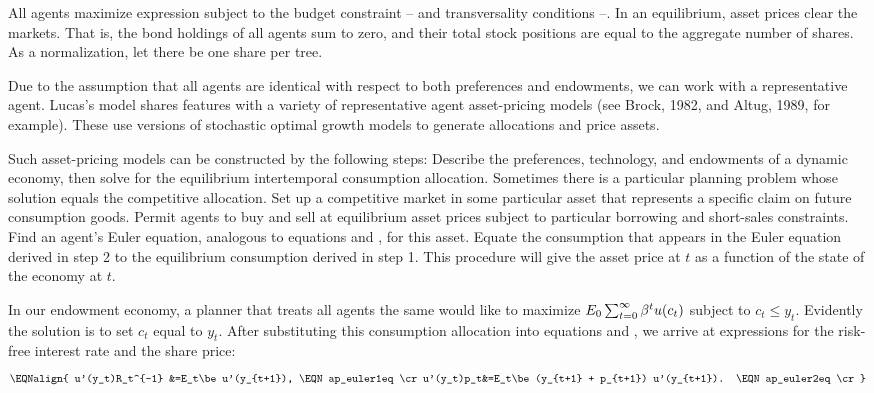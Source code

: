 All agents maximize expression  subject to the
budget constraint -- and transversality
conditions --. In an equilibrium, asset prices
clear the markets. That is, the bond holdings of all
agents sum to zero, and their total stock positions are equal to
the aggregate number of shares. As a normalization, let there be
one share per tree.

Due to the assumption that all agents are identical with respect to both
preferences and endowments, we can work with a representative
agent.
Lucas's model shares features with a variety of
representative agent asset-pricing models (see Brock, 1982, and Altug,
1989, for example).  These use versions of stochastic optimal growth models
to generate allocations and price assets.

Such asset-pricing models can be constructed by the following
steps:
\medskip
{} Describe the preferences, technology, and endowments of a dynamic
economy, then solve for the equilibrium intertemporal consumption allocation.
Sometimes there is a particular  planning problem
whose solution equals the competitive allocation.
\medskip
{} Set up a competitive market in some particular asset that
represents a specific claim on future consumption goods.  Permit
agents to buy and sell at equilibrium asset prices subject to particular
borrowing and short-sales constraints.  Find an agent's Euler equation,
analogous to equations  and , for this asset.
\medskip
{} Equate the consumption that appears in the Euler equation
derived in step 2 to the equilibrium consumption derived in step 1.
This procedure will give the asset price at $t$ as a function of the
state of the economy at $t$.

\medskip
\noindent
In our endowment economy, a planner that treats all agents the same
would like to maximize
$E_0\sum_{t=0}^\infty {\beta}^t u(c_t)$ subject to $c_t\le y_t$.  Evidently the
solution is to set $c_t$ equal to $y_t$. After substituting this
consumption allocation into equations
 and , we arrive
at expressions for the risk-free interest rate and
the share price:
$$\EQNalign{
u'(y_t)R_t^{-1} &=E_t\be u'(y_{t+1}),                       \EQN ap_euler1eq  \cr
u'(y_t)p_t&=E_t\be (y_{t+1} + p_{t+1}) u'(y_{t+1}).    \EQN ap_euler2eq  \cr}
$$


